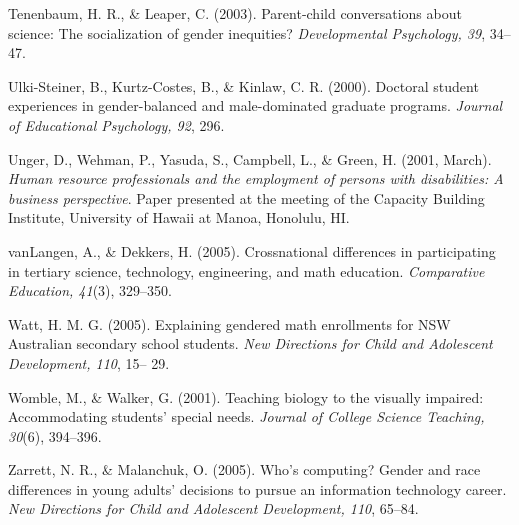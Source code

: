 \documentclass[11.5pt]{sig-alternate} %
\begin{document}
Tenenbaum, H. R., \& Leaper, C. (2003). Parent-child conversations about science: The socialization of gender inequities? 
\textit{Developmental Psychology, 39}, 34–47.  
 
Ulki-Steiner, B., Kurtz-Costes, B., \& Kinlaw, C. R. (2000). Doctoral student experiences in gender-balanced and male-dominated graduate programs. \textit{Journal of Educational Psychology, 92}, 296. 
 
Unger, D., Wehman, P., Yasuda, S., Campbell, L., \& Green, H. (2001, March). \textit{Human resource professionals and the employment of persons with disabilities: A business perspective}. Paper presented at the meeting of the Capacity Building Institute, University of Hawaii at Manoa, Honolulu, HI.  
 
vanLangen, A., \& Dekkers, H. (2005). Crossnational differences in participating in tertiary science, technology, engineering, and math education. \textit{Comparative Education, 41}(3), 329–350.  
 
Watt, H. M. G. (2005). Explaining gendered math enrollments for NSW Australian secondary school students. \textit{New Directions for Child and Adolescent Development, 110}, 15– 29. 
 
Womble, M., \& Walker, G. (2001). Teaching biology to the visually impaired: Accommodating students’ special needs. \textit{Journal of College Science Teaching, 30}(6), 394–396. 
 
Zarrett, N. R., \& Malanchuk, O. (2005). Who’s computing? Gender and race differences in young adults’ decisions to pursue an information technology career. \textit{New Directions for Child and Adolescent Development, 110}, 65–84.  
\end{document}
